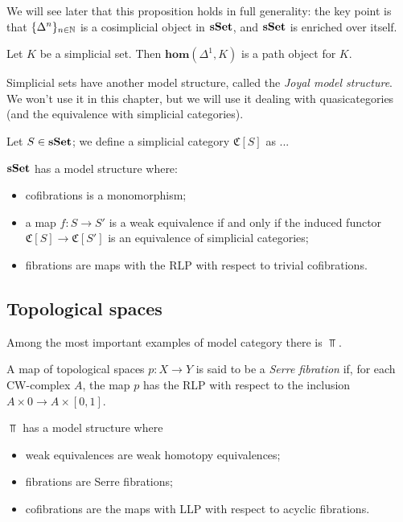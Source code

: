 \begin{refsection}
We will see later that this proposition holds in full generality: the key point is that $\{\Delta^n\}_{n \in \mathbb{N}}$ is a cosimplicial object in $\mathbf{sSet}$, and $\mathbf{sSet}$ is enriched over itself.

\begin{prop}
Let $K$ be a simplicial set. Then $\mathbf{hom}(\Delta^1,K)$ is a path object for $K$.
\end{prop}

Simplicial sets have another model structure, called the \emph{Joyal model structure}. We won't use it in this chapter, but we will use it dealing with quasicategories (and the equivalence with simplicial categories).

\begin{defin}
Let $S \in \mathbf{sSet}$; we define a simplicial category $\mathfrak C[S]$ as ...
\end{defin}

\begin{thm} \label{thm joyal model structure}
$\mathbf{sSet}$ has a model structure where:
\begin{itemize}
\item cofibrations is a monomorphism;
\item a map $f \colon S \to S'$ is a weak equivalence if and only if the induced functor $\mathfrak C[S] \to \mathfrak C[S']$ is an equivalence of simplicial categories;
\item fibrations are maps with the RLP with respect to trivial cofibrations.
\end{itemize}
\end{thm}

\subsection{Topological spaces}

Among the most important examples of model category there is $\Top$.

\begin{defin}
A map of topological spaces $p \colon X \to Y$ is said to be a \emph{Serre fibration} if, for each CW-complex $A$, the map $p$ has the RLP with respect to the inclusion $A \times 0 \to A \times [0,1]$.
\end{defin}

\begin{thm} \label{thm model structure top}
$\Top$ has a model structure where
\begin{itemize}
\item weak equivalences are weak homotopy equivalences;
\item fibrations are Serre fibrations;
\item cofibrations are the maps with LLP with respect to acyclic fibrations.
\end{itemize}
\end{thm}


\end{refsection}
